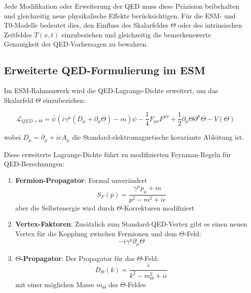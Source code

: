 \documentclass[12pt,a4paper]{article}
\newcommand{\Tfieldt}{T(x,t)}
\begin{document}
	Jede Modifikation oder Erweiterung der QED muss diese Präzision beibehalten und gleichzeitig neue physikalische Effekte berücksichtigen. Für die ESM- und T0-Modelle bedeutet dies, den Einfluss des Skalarfeldes $\Theta$ oder des intrinsischen Zeitfeldes $\Tfieldt$ einzubeziehen und gleichzeitig die bemerkenswerte Genauigkeit der QED-Vorhersagen zu bewahren.
	
	\subsection{Erweiterte QED-Formulierung im ESM}
	\label{subsec:extended_qed}
	
	Im ESM-Rahmenwerk wird die QED-Lagrange-Dichte erweitert, um das Skalarfeld $\Theta$ einzubeziehen:
	
	\begin{equation}
		\mathcal{L}_{QED+\Theta} = \bar{\psi}(i\gamma^{\mu}(D_{\mu} + \partial_{\mu}\Theta) - m)\psi - \frac{1}{4}F_{\mu\nu}F^{\mu\nu} + \frac{1}{2}\partial_{\mu}\Theta\partial^{\mu}\Theta - V(\Theta)
		\label{eq:extended_qed_lagrangian}
	\end{equation}
	
	wobei $D_{\mu} = \partial_{\mu} + ieA_{\mu}$ die Standard-elektromagnetische kovariante Ableitung ist.
	
	Diese erweiterte Lagrange-Dichte führt zu modifizierten Feynman-Regeln für QED-Berechnungen:
	
	\begin{enumerate}
		\item \textbf{Fermion-Propagator}: Formal unverändert
		\begin{equation}
			S_F(p) = \frac{\gamma^{\mu}p_{\mu} + m}{p^2 - m^2 + i\epsilon}
			\label{eq:fermion_propagator}
		\end{equation}
		aber die Selbstenergie wird durch $\Theta$-Korrekturen modifiziert
		
		\item \textbf{Vertex-Faktoren}: Zusätzlich zum Standard-QED-Vertex gibt es einen neuen Vertex für die Kopplung zwischen Fermionen und dem $\Theta$-Feld:
		\begin{equation}
			-i\gamma^{\mu}\partial_{\mu}\Theta
			\label{eq:theta_vertex}
		\end{equation}
		
		\item \textbf{$\Theta$-Propagator}: Der Propagator für das $\Theta$-Feld:
		\begin{equation}
			D_{\Theta}(k) = \frac{i}{k^2 - m_{\Theta}^2 + i\epsilon}
			\label{eq:theta_propagator}
		\end{equation}
		mit einer möglichen Masse $m_{\Theta}$ des $\Theta$-Feldes
	\end{enumerate}
	
\end{document}
